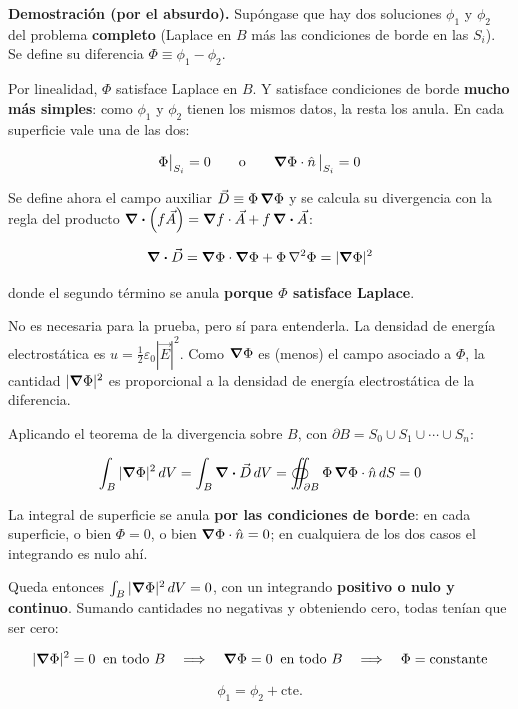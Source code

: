 \documentclass[12pt,a4paper]{article}
\begin{document}
\textbf{Demostración (por el absurdo).} Supóngase que hay dos soluciones $\phi_1$
y $\phi_2$ del problema \textbf{completo} (Laplace en $B$ más las condiciones de
borde en las $S_i$). Se define su diferencia $\Phi \equiv \phi_1 - \phi_2$.

Por linealidad, $\Phi$ satisface Laplace en $B$. Y satisface condiciones de borde
\textbf{mucho más simples}: como $\phi_1$ y $\phi_2$ tienen los mismos datos, la
resta los anula. En cada superficie vale una de las dos:

\[
\Phi\big|_{S_i} = 0 \qquad\text{o}\qquad \grad\Phi\cdot\hat n\,\big|_{S_i} = 0
\]

Se define ahora el campo auxiliar $\vec D \equiv \Phi\,\grad\Phi$ y se calcula su
divergencia con la regla del producto
$\div(f\vec A) = \grad f\cdot\vec A + f\,\div\vec A$:

\[
\div\vec D = \grad\Phi\cdot\grad\Phi + \Phi\,\laplacian\Phi = |\grad\Phi|^2
\]

donde el segundo término se anula \textbf{porque $\Phi$ satisface Laplace}.

\begin{notebox}
No es necesaria para la prueba, pero sí para entenderla. La densidad de energía
electrostática es $u = \tfrac{1}{2}\varepsilon_0|\vec E|^2$. Como $\grad\Phi$ es
(menos) el campo asociado a $\Phi$, la cantidad $|\grad\Phi|^2$ es proporcional a
la densidad de energía electrostática de la diferencia.
\end{notebox}

Aplicando el teorema de la divergencia sobre $B$, con
$\partial B = S_0 \cup S_1 \cup \cdots \cup S_n$:

\[
\int_B |\grad\Phi|^2\,dV = \int_B \div\vec D\,dV
= \oiint_{\partial B} \Phi\,\grad\Phi\cdot\hat n\,dS = 0
\]

La integral de superficie se anula \textbf{por las condiciones de borde}: en cada
superficie, o bien $\Phi = 0$, o bien $\grad\Phi\cdot\hat n = 0$; en cualquiera de
los dos casos el integrando es nulo ahí.

Queda entonces $\int_B |\grad\Phi|^2\,dV = 0$, con un integrando \textbf{positivo
o nulo y continuo}. Sumando cantidades no negativas y obteniendo cero, todas
tenían que ser cero:

\[
|\grad\Phi|^2 = 0 \;\;\text{en todo }B
\quad\Longrightarrow\quad
\grad\Phi = 0 \;\;\text{en todo }B
\quad\Longrightarrow\quad
\Phi = \text{constante}
\]

\[
\boxed{\;\phi_1 = \phi_2 + \text{cte.}\;}
\]
\end{document}
